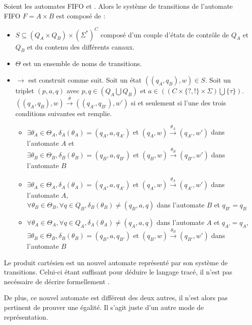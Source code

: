 Soient les automates FIFO \fifoA et \fifoB. Alors le système de transitions \tsys de l'automate FIFO $F=A\times B$ est composé de :
\begin{itemize}
  \item $S \subseteq (Q_A\times Q_B)\times (\Sigma^*)^C$ composé d'un couple d'états de contrôle de $Q_A$ et $Q_B$ et du contenu des différents canaux.
  \item $\Theta$ est un ensemble de noms de transitions.
  \item $\rightarrow$ est construit comme suit. Soit un état $((q_A,q_B), w)\in S$. Soit un triplet $(p,a,q)$ avec $p,q \in (Q_A \bigcup Q_B)$ et $a \in ((C \times \{?,!\} \times \Sigma) \bigcup \{\tau\})$.
  $((q_A,q_B),w)\xrightarrow{\theta}((q_{A'},q_{B'}),w')$ si et seulement si l'une des trois conditions suivantes est remplie.
  \begin{itemize}
    \item $\exists \theta_A\in\Theta_A, \delta_A(\theta_A)=(q_A,a,q_{A'})$ et  $(q_A,w)\xrightarrow{\theta_A}(q_{A'},w')$ dans l'automate $A$ et\\ $\exists \theta_B\in\Theta_B, \delta_B(\theta_B)=(q_B,a,q_{B'})$ et $(q_B,w)\xrightarrow{\theta_B}(q_{B'},w')$ dans l'automate $B$
    \item $\exists \theta_A\in\Theta_A, \delta_A(\theta_A)=(q_A,a,q_{A'})$ et  $(q_A,w)\xrightarrow{\theta_A}(q_{A'},w')$ dans l'automate $A$,\\
    $\forall \theta_B\in\Theta_B,\forall q \in Q_B,\delta_B(\theta_B)\neq(q_B,a,q)$ dans l'automate $B$ et $q_{B'}=q_B$
    \item $\forall \theta_A\in\Theta_A,\forall q \in Q_A,\delta_A(\theta_A)\neq(q_A,a,q)$ dans l'automate $A$ et $q_{A'}=q_A$,\\
    $\exists \theta_B\in\Theta_B, \delta_B(\theta_B)=(q_B,a,q_{B'})$ et  $(q_B,w)\xrightarrow{\theta_B}(q_{B'},w')$ dans l'automate $B$
  \end{itemize}
\end{itemize}

Le produit cartésien est un nouvel automate représenté par son système de transitions. Celui-ci étant suffisant pour déduire le langage tracé, il n'est pas necéssaire de décrire formellement \fifo.

De plus, ce nouvel automate est différent des deux autres, il n'est alors pas pertinent de prouver une égalité. Il s'agit juste d'un autre mode de représentation.




